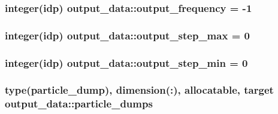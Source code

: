 \subsubsection[{\texorpdfstring{output\+\_\+frequency}{output_frequency}}]{\setlength{\rightskip}{0pt plus 5cm}integer(idp) output\+\_\+data\+::output\+\_\+frequency = -\/1}\hypertarget{namespaceoutput__data_aa9299257a58dc37dd6c11e96a637459a}{}\label{namespaceoutput__data_aa9299257a58dc37dd6c11e96a637459a}
\subsubsection[{\texorpdfstring{output\+\_\+step\+\_\+max}{output_step_max}}]{\setlength{\rightskip}{0pt plus 5cm}integer(idp) output\+\_\+data\+::output\+\_\+step\+\_\+max = 0}\hypertarget{namespaceoutput__data_a310f5ada2926521513b808272a40764d}{}\label{namespaceoutput__data_a310f5ada2926521513b808272a40764d}
\subsubsection[{\texorpdfstring{output\+\_\+step\+\_\+min}{output_step_min}}]{\setlength{\rightskip}{0pt plus 5cm}integer(idp) output\+\_\+data\+::output\+\_\+step\+\_\+min = 0}\hypertarget{namespaceoutput__data_aea2eeeb3470d4377a87117bb1aeb2ae4}{}\label{namespaceoutput__data_aea2eeeb3470d4377a87117bb1aeb2ae4}
\subsubsection[{\texorpdfstring{particle\+\_\+dumps}{particle_dumps}}]{\setlength{\rightskip}{0pt plus 5cm}type({\bf particle\+\_\+dump}), dimension(\+:), allocatable, target output\+\_\+data\+::particle\+\_\+dumps}\hypertarget{namespaceoutput__data_a5fbbbcc739158cb15a4a02aa8bc63399}{}\label{namespaceoutput__data_a5fbbbcc739158cb15a4a02aa8bc63399}
